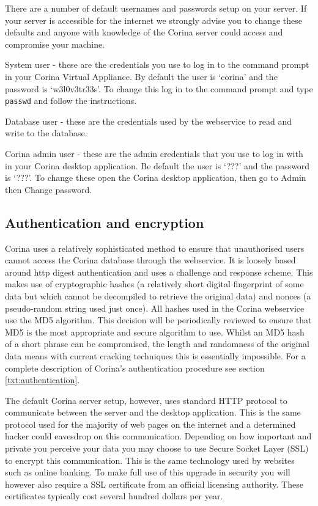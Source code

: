 There are a number of default usernames and passwords setup on your server.  If your server is accessible for the internet we strongly advise you to change these defaults and anyone with knowledge of the Corina server could access and compromise your machine.

\begin{description*}
 \item[System user] - these are the credentials you use to log in to the command prompt in your Corina Virtual Appliance.  By default the user is `corina' and the password is `w3l0v3tr33s'.  To change this log in to the command prompt and type \verb|passwd| and follow the instructions.
 \item[Database user] - these are the credentials used by the webservice to read and write to the database.  
 \item[Corina admin user] - these are the admin credentials that you use to log in with in your Corina desktop application.  Be default the user is `???' and the password is `???'.  To change these open the Corina desktop application, then go to Admin then Change password.
\end{description*}

\subsection{Authentication and encryption}
 
Corina uses a relatively sophisticated method to ensure that unauthorised users cannot access the Corina database through the webservice.  It is loosely based around http digest authentication and uses a challenge and response scheme.  This makes use of cryptographic hashes (a relatively short digital fingerprint of some data but which cannot be decompiled to retrieve the original data) and nonces (a pseudo-random string used just once). All hashes used in the Corina webservice use the MD5 algorithm. This decision will be periodically reviewed to ensure that MD5 is the most appropriate and secure algorithm to use. Whilst an MD5 hash of a short phrase can be compromised, the length and randomness of the original data means with current cracking techniques this is essentially impossible.   For a complete description of Corina's authentication procedure see section \ref{txt:authentication}.

The default Corina server setup, however, uses standard HTTP protocol to communicate between the server and the desktop application.  This is the same protocol used for the majority of web pages on the internet and a determined hacker could eavesdrop on this communication.  Depending on how important and private you perceive your data you may choose to use Secure Socket Layer (SSL) to encrypt this communication.  This is the same technology used by websites such as online banking.  To make full use of this upgrade in security you will however also require a SSL certificate from an official licensing authority.  These certificates typically cost several hundred dollars per year. 


